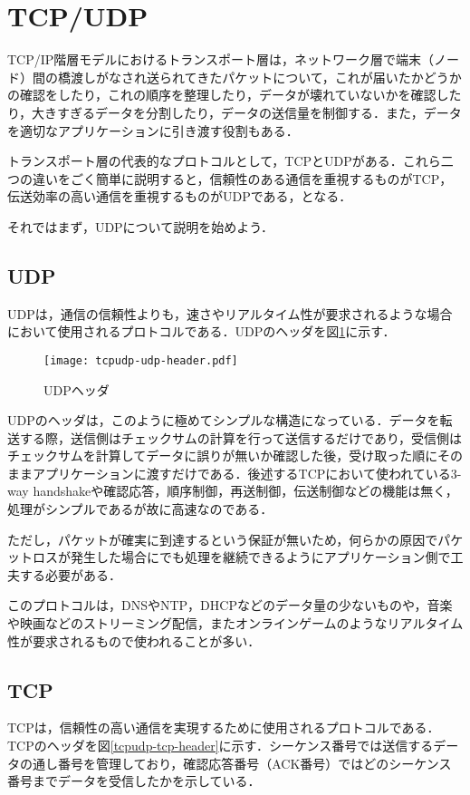 \section{TCP/UDP}
TCP/IP階層モデルにおけるトランスポート層は，ネットワーク層で端末（ノード）間の橋渡しがなされ送られてきたパケットについて，これが届いたかどうかの確認をしたり，これの順序を整理したり，データが壊れていないかを確認したり，大きすぎるデータを分割したり，データの送信量を制御する．また，データを適切なアプリケーションに引き渡す役割もある．

トランスポート層の代表的なプロトコルとして，TCPとUDPがある．これら二つの違いをごく簡単に説明すると，信頼性のある通信を重視するものがTCP，伝送効率の高い通信を重視するものがUDPである，となる．

それではまず，UDPについて説明を始めよう．

\subsection{UDP}
UDPは，通信の信頼性よりも，速さやリアルタイム性が要求されるような場合において使用されるプロトコルである．UDPのヘッダを図\ref{tcpudp-udp-header}に示す．

\begin{figure}[htb]
  \centering
  \texttt{[image: tcpudp-udp-header.pdf]}
  \caption{UDPヘッダ}
  \label{tcpudp-udp-header}
\end{figure}

UDPのヘッダは，このように極めてシンプルな構造になっている．データを転送する際，送信側はチェックサムの計算を行って送信するだけであり，受信側はチェックサムを計算してデータに誤りが無いか確認した後，受け取った順にそのままアプリケーションに渡すだけである．後述するTCPにおいて使われている3-way handshakeや確認応答，順序制御，再送制御，伝送制御などの機能は無く，処理がシンプルであるが故に高速なのである．

ただし，パケットが確実に到達するという保証が無いため，何らかの原因でパケットロスが発生した場合にでも処理を継続できるようにアプリケーション側で工夫する必要がある．

このプロトコルは，DNSやNTP，DHCPなどのデータ量の少ないものや，音楽や映画などのストリーミング配信，またオンラインゲームのようなリアルタイム性が要求されるもので使われることが多い．

\subsection{TCP}
TCPは，信頼性の高い通信を実現するために使用されるプロトコルである．TCPのヘッダを図\ref{tcpudp-tcp-header}に示す．シーケンス番号では送信するデータの通し番号を管理しており，確認応答番号（ACK番号）ではどのシーケンス番号までデータを受信したかを示している．

